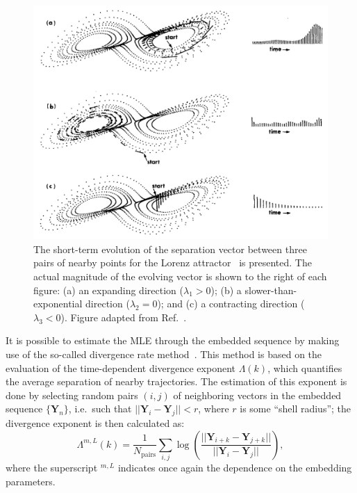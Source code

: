 \begin{figure}[!htbp]
\centering
\includegraphics[width=\linewidth]{images/lorenz_lyapunov.png}   
\caption{
    The short-term evolution of the separation vector between three pairs of nearby points for the Lorenz attractor~\cite{lorenz1963deterministic} is presented. The actual magnitude of the evolving vector is shown to the right of each figure: (a) an expanding direction ($\lambda_1 > 0$); (b) a slower-than-exponential direction ($\lambda_2 = 0$); and (c) a contracting direction ($\lambda_3 < 0$).
    Figure adapted from Ref.~\cite{wolf1986quantifying}.
}\label{fig: lorenz lyapunov}
\end{figure}

It is possible to estimate the MLE through the embedded sequence by making use of the so-called
divergence rate method~\cite{ref:gao1993local}. This method
is based on the evaluation of the time-dependent divergence exponent $\Lambda(k)$,
which quantifies the average separation of nearby trajectories.
The estimation of this exponent is done by selecting random pairs $(i,j)$ of neighboring vectors
in the embedded sequence $\{\mathbf{Y}_n\}$, i.e.\ such that $||\mathbf{Y}_i-\mathbf{Y}_j||<r$,
where $r$ is some ``shell radius''; the divergence exponent is then calculated as:
\begin{equation}
    \label{eq: divergence exponent}
    \Lambda^{m,L}(k)=\frac{1}{N_{\text{pairs}}}\sum_{i,j}\log\left(
        \frac{||\mathbf{Y}_{i+k}-\mathbf{Y}_{j+k}||}{||\mathbf{Y}_i-\mathbf{Y}_j||}
    \right),
\end{equation}
where the superscript $^{m,L}$ indicates once again the dependence on the embedding parameters.

